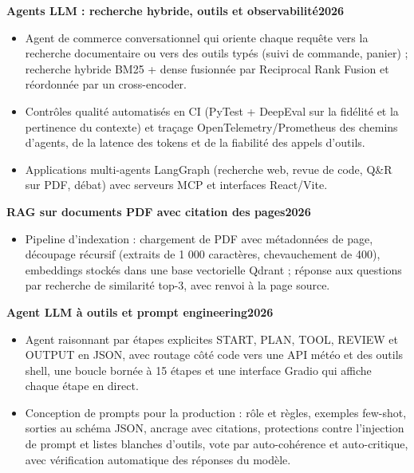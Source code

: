 \documentclass[10pt,a4paper]{article}
\newenvironment{cvitems}{\begin{itemize}[leftmargin=11pt,itemsep=0.5pt,topsep=1pt,parsep=0pt,label={\color{accent}\scriptsize$\blacktriangleright$}]\small}{\end{itemize}\vspace{2pt}}
\newcommand{\cvproject}[3]{%
  \noindent\textbf{#1}\hfill{\small\bfseries\textcolor{accent}{#2}}\par
  \noindent{\footnotesize\textcolor{muted}{#3}}\par}
\begin{document}
\cvproject{Agents LLM : recherche hybride, outils et observabilité}{2026}{LangGraph, MCP, BM25 + dense, RRF, cross-encoder, Pydantic, DeepEval, OpenTelemetry, React}
\begin{cvitems}
  \item Agent de commerce conversationnel qui oriente chaque requête vers la recherche documentaire ou vers des outils typés (suivi de commande, panier) ; recherche hybride BM25 + dense fusionnée par Reciprocal Rank Fusion et réordonnée par un cross-encoder.
  \item Contrôles qualité automatisés en CI (PyTest + DeepEval sur la fidélité et la pertinence du contexte) et traçage OpenTelemetry/Prometheus des chemins d’agents, de la latence des tokens et de la fiabilité des appels d’outils.
  \item Applications multi-agents LangGraph (recherche web, revue de code, Q\&R sur PDF, débat) avec serveurs MCP et interfaces React/Vite.
\end{cvitems}

\cvproject{RAG sur documents PDF avec citation des pages}{2026}{LangChain, Qdrant (Docker), OpenAI text-embedding-3-large, gpt-4o-mini}
\begin{cvitems}
  \item Pipeline d’indexation : chargement de PDF avec métadonnées de page, découpage récursif (extraits de 1 000 caractères, chevauchement de 400), embeddings stockés dans une base vectorielle Qdrant ; réponse aux questions par recherche de similarité top-3, avec renvoi à la page source.
\end{cvitems}

\cvproject{Agent LLM à outils et prompt engineering}{2026}{API OpenAI (mode JSON), gpt-4o-mini, Gradio, sorties structurées, few-shot, auto-cohérence}
\begin{cvitems}
  \item Agent raisonnant par étapes explicites START, PLAN, TOOL, REVIEW et OUTPUT en JSON, avec routage côté code vers une API météo et des outils shell, une boucle bornée à 15 étapes et une interface Gradio qui affiche chaque étape en direct.
  \item Conception de prompts pour la production : rôle et règles, exemples few-shot, sorties au schéma JSON, ancrage avec citations, protections contre l’injection de prompt et listes blanches d’outils, vote par auto-cohérence et auto-critique, avec vérification automatique des réponses du modèle.
\end{cvitems}
\end{document}
